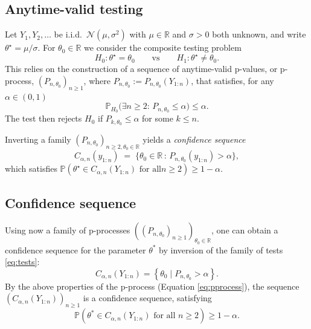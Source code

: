 \documentclass{article}%
\newcommand{\Prob}{\mathbb{P}}
\newcommand{\1}{\mathbf{1}}
\begin{document}
\subsection{Anytime-valid testing}

Let \(Y_1,Y_2,\ldots\) be i.i.d.\ \(\mathcal N(\mu,\sigma^2)\) with
\(\mu\in\mathbb{R}\) and \(\sigma>0\) both unknown, and write
\(\theta^\star=\mu/\sigma\). For \(\theta_0\in\mathbb{R}\) we consider the
composite testing problem
\begin{equation}\label{eq:tests}
   H_0\!:\theta^\star=\theta_0 \qquad\text{vs}\qquad
   H_1\!:\theta^\star\neq\theta_0.
\end{equation}
This relies on the construction of a sequence of anytime-valid p-values, or p-process, $(P_{n,\theta_0})_{n\geq 1}$, where $P_{n,\theta_0}:=P_{n,\theta_0}(Y_{1:n})$, that satisfies, for any $\alpha\in (0,1)$
\begin{equation}\label{eq:pprocess}
   \Prob_{H_0}\!\bigl(\exists n\geq 2:\, P_{n,\theta_0}\leq \alpha\bigr)
   \leq \alpha.
\end{equation}
The test then rejects $H_0$ if $P_{k,\theta_0}\leq \alpha$ for some $k\leq n$. 

Inverting a family \((P_{n,\theta_0})_{n\geq 2,\theta_0\in\mathbb{R}}\) yields
a \emph{confidence sequence}
\begin{equation}\label{eq:CS-from-pproc}
   C_{\alpha,n}(y_{1:n})
   \;=\;\bigl\{\theta_0\in\mathbb{R}\,:\,P_{n,\theta_0}(y_{1:n})>\alpha\bigr\},
\end{equation}
which satisfies
\(\Prob(\theta^\star\in C_{\alpha,n}(Y_{1:n})\text{ for all
}n\geq 2)\geq 1-\alpha\).

\subsection{Confidence sequence}

Using now a family of p-processes $((P_{n,\theta_0})_{n\geq 1})_{\theta_0\in\mathbb R}$, one can obtain a confidence sequence for the parameter $\theta^*$ by inversion of the family of tests \eqref{eq:tests}:
$$
C_{\alpha,n}(Y_{1:n})=\left\{ \theta_0 \mid P_{n,\theta_0}> \alpha\right \}.
$$
By the above properties of the p-process (Equation \eqref{eq:pprocess}), the sequence $(C_{\alpha,n}(Y_{1:n}))_{n \geq 1}$ is a confidence sequence, satisfying
$$
\mathbb P(\theta^*  \in C_{\alpha,n}(Y_{1:n}) \text{ for all }n\geq 2)\geq 1-\alpha.
$$
\end{document}
